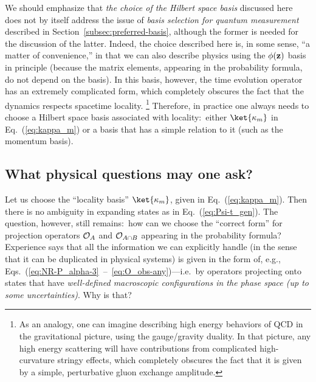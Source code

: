 \documentclass[12pt]{article}
\begin{document}
We should emphasize that {\it the choice of the Hilbert space 
basis} discussed here does not by itself address the issue of 
{\it basis selection for quantum measurement} described in 
Section~\ref{subsec:preferred-basis}, although the former is needed 
for the discussion of the latter.  Indeed, the choice described here 
is, in some sense, ``a matter of convenience,'' in that we can also 
describe physics using the $\phi({\bf z})$ basis in principle (because 
the matrix elements, appearing in the probability formula, do not 
depend on the basis).  In this basis, however, the time evolution 
operator has an extremely complicated form, which completely obscures 
the fact that the dynamics respects spacetime locality.%
\footnote{As an analogy, one can imagine describing high energy behaviors 
 of QCD in the gravitational picture, using the gauge/gravity duality. 
 In that picture, any high energy scattering will have contributions 
 from complicated high-curvature stringy effects, which completely 
 obscures the fact that it is given by a simple, perturbative 
 gluon exchange amplitude.}
Therefore, in practice one always needs to choose a Hilbert space basis 
associated with locality:\ either $\ket{\kappa_m}$ in Eq.~(\ref{eq:kappa_m}) 
or a basis that has a simple relation to it (such as the momentum basis).


\subsection{What physical questions may one ask?}
\label{subsec:questions}

Let us choose the ``locality basis'' $\ket{\kappa_m}$, given in 
Eq.~(\ref{eq:kappa_m}).  Then there is no ambiguity in expanding states 
as in Eq.~(\ref{eq:Psi-t_gen}).  The question, however, still remains:\ 
how can we choose the ``correct form'' for projection operators ${\cal O}_A$ 
and ${\cal O}_{A \cap B}$ appearing in the probability formula?  Experience 
says that all the information we can explicitly handle (in the sense 
that it can be duplicated in physical systems) is given in the form 
of, e.g., Eqs.~(\ref{eq:NR-P_alpha-3}~--~\ref{eq:O_obs-any})---i.e.\ by 
operators projecting onto states that have {\it well-defined macroscopic 
configurations in the phase space (up to some uncertainties)}.  Why 
is that?
\end{document}
